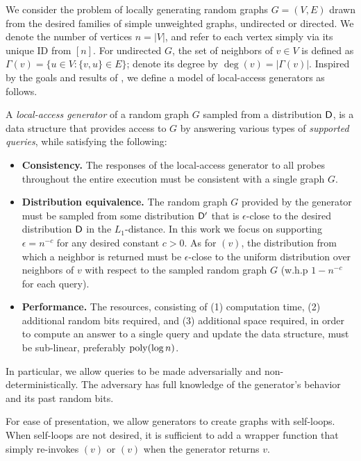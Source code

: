 We consider the problem of locally generating random graphs $G = (V,E)$ drawn from the desired families of simple unweighted graphs, undirected or directed. We denote the number of vertices $n = |V|$, and refer to each vertex simply via its unique ID from $[n]$. For undirected $G$, the set of neighbors of $v \in V$ is defined as $\Gamma(v) = \{u \in V: \{v,u\} \in E\}$; denote its degree by $\deg(v) = |\Gamma(v)|$.
Inspired by the goals and results of \cite{reut}, we define a model of local-access generators as follows.
\begin{definition}
A \emph{local-access generator} of a random graph $G$ sampled from a distribution $\mathsf{D}$,
is a data structure that provides access to $G$ by answering various types of
\emph{supported queries}, while satisfying the following:
\begin{itemize}
\item \textbf{Consistency.} The responses of the local-access generator to all probes throughout the entire execution must be consistent with a single graph $G$.
\item \textbf{Distribution equivalence.} 
The random graph $G$ provided by the generator must be sampled from some distribution $\mathsf{D}'$
that is $\epsilon$-close to the desired distribution $\mathsf{D}$ in the $L_1$-distance.
In this work we focus on supporting $\epsilon = n^{-c}$ for any desired constant $c>0$.
As for $(v)$, the distribution from which a neighbor is returned
must be $\epsilon$-close to the uniform distribution over neighbors of $v$
with respect to the sampled random graph $G$ (w.h.p $1-n^{-c}$ for each query).
\item \textbf{Performance.} The resources, consisting of (1) computation time, (2) additional random bits required, and (3) additional space required, in order to compute an answer to a single query and update the data structure, must be sub-linear, preferably $\mathrm{poly}(\log n)$.
\end{itemize}
\end{definition}
In particular, we allow queries to be made adversarially and non-deterministically. The adversary has full knowledge of the generator's behavior and its past random bits.

For ease of presentation, we allow generators to create graphs with self-loops.
When self-loops are not desired, it is sufficient to add a wrapper function that simply re-invokes $(v)$ or $(v)$ when the generator returns $v$.


